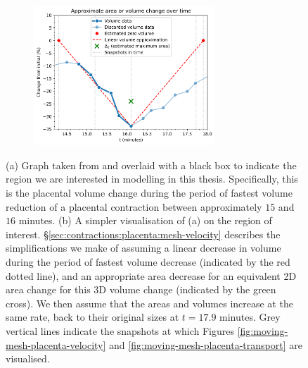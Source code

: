             \begin{figure}
                \centering
                \begin{subfigure}{\textwidth}
                    \centering
                    
                    \caption{}
                    \label{fig:contraction-data:raw}
                \end{subfigure}
                \begin{subfigure}{\textwidth}
                    \centering
                    \includegraphics[width=0.75\textwidth]{diagrams/results-contractions/extracted-contraction-data.png}
                    \caption{}
                    \label{fig:contraction-data:extracted}
                \end{subfigure}
                \caption{(a) Graph taken from \citeauthor{gowlandCharacterisingPlacentalContractions2024} \cite{gowlandCharacterisingPlacentalContractions2024} and overlaid with a black box to indicate the region we are interested in modelling in this thesis. Specifically, this is the placental volume change during the period of fastest volume reduction of a placental contraction between approximately $15$ and $16$ minutes. (b) A simpler visualisation of (a) on the region of interest. \S\ref{sec:contractions:placenta:mesh-velocity} describes the simplifications we make of assuming a linear decrease in volume during the period of fastest volume decrease (indicated by the red dotted line), and an appropriate area decrease for an equivalent 2D area change for this 3D volume change (indicated by the green cross). We then assume that the areas and volumes increase at the same rate, back to their original sizes at $t = 17.9$ minutes. Grey vertical lines indicate the snapshots at which Figures \ref{fig:moving-mesh-placenta-velocity} and \ref{fig:moving-mesh-placenta-transport} are visualised.}
                \label{fig:contraction-data}
            \end{figure}
            
